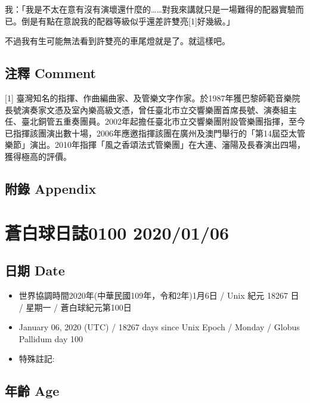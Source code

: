 \documentclass[
]{article}
\providecommand{\tightlist}{%
  \setlength{\itemsep}{0pt}\setlength{\parskip}{0pt}}
\begin{document}
我：「我是不太在意有沒有演壞還什麼的\ldots\ldots 對我來講就只是一場難得的配器實驗而已。倒是有點在意說我的配器等級似乎還差許雙亮{[}1{]}好幾級。」

不過我有生可能無法看到許雙亮的車尾燈就是了。就這樣吧。

\hypertarget{ux6ce8ux91cb-comment-4}{%
\subsection{注釋 Comment}\label{ux6ce8ux91cb-comment-4}}

{[}1{]}
臺灣知名的指揮、作曲編曲家、及管樂文字作家。於1987年獲巴黎師範音樂院長號演奏家文憑及室內樂高級文憑，曾任臺北市立交響樂團首席長號、演奏組主任、臺北銅管五重奏團員。2002年起擔任臺北市立交響樂團附設管樂團指揮，至今已指揮該團演出數十場，2006年應邀指揮該團在廣州及澳門舉行的「第14屆亞太管樂節」演出。2010年指揮「風之香頌法式管樂團」在大連、瀋陽及長春演出四場，獲得極高的評價。

\hypertarget{ux9644ux9304-appendix-4}{%
\subsection{附錄 Appendix}\label{ux9644ux9304-appendix-4}}

\hypertarget{ux84bcux767dux7403ux65e5ux8a8c0100-20200106}{%
\section{蒼白球日誌0100
2020/01/06}\label{ux84bcux767dux7403ux65e5ux8a8c0100-20200106}}

\hypertarget{ux65e5ux671f-date-5}{%
\subsection{日期 Date}\label{ux65e5ux671f-date-5}}

\begin{itemize}
\tightlist
\item
  世界協調時間2020年(中華民國109年，令和2年)1月6日 / Unix 紀元 18267 日
  / 星期一 / 蒼白球紀元第100日
\item
  January 06, 2020 (UTC) / 18267 days since Unix Epoch / Monday / Globus
  Pallidum day 100
\item
  特殊註記:
\end{itemize}

\hypertarget{ux5e74ux9f61-age-5}{%
\subsection{年齡 Age}\label{ux5e74ux9f61-age-5}}
\end{document}

